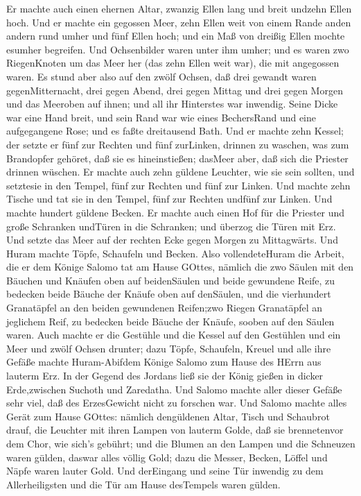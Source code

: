  Er machte auch einen ehernen Altar, zwanzig Ellen lang und
breit undzehn Ellen hoch.  Und er machte ein gegossen Meer,
zehn Ellen weit von einem Rande anden andern rund umher und fünf Ellen
hoch; und ein Maß von dreißig Ellen mochte esumher begreifen.
 Und Ochsenbilder waren unter ihm umher; und es waren zwo
RiegenKnoten um das Meer her (das zehn Ellen weit war), die mit
angegossen waren.  Es stund aber also auf den zwölf Ochsen,
daß drei gewandt waren gegenMitternacht, drei gegen Abend, drei gegen
Mittag und drei gegen Morgen und das Meeroben auf ihnen; und all ihr
Hinterstes war inwendig.  Seine Dicke war eine Hand breit,
und sein Rand war wie eines BechersRand und eine aufgegangene Rose; und
es faßte dreitausend Bath.  Und er machte zehn Kessel; der
setzte er fünf zur Rechten und fünf zurLinken, drinnen zu waschen, was
zum Brandopfer gehöret, daß sie es hineinstießen; dasMeer aber, daß sich
die Priester drinnen wüschen.  Er machte auch zehn güldene
Leuchter, wie sie sein sollten, und setztesie in den Tempel, fünf zur
Rechten und fünf zur Linken.  Und machte zehn Tische und tat
sie in den Tempel, fünf zur Rechten undfünf zur Linken. Und machte
hundert güldene Becken.  Er machte auch einen Hof für die
Priester und große Schranken undTüren in die Schranken; und überzog die
Türen mit Erz.  Und setzte das Meer auf der rechten Ecke
gegen Morgen zu Mittagwärts.  Und Huram machte Töpfe,
Schaufeln und Becken. Also vollendeteHuram die Arbeit, die er dem Könige
Salomo tat am Hause GOttes,  nämlich die zwo Säulen mit den
Bäuchen und Knäufen oben auf beidenSäulen und beide gewundene Reife, zu
bedecken beide Bäuche der Knäufe oben auf denSäulen,  und
die vierhundert Granatäpfel an den beiden gewundenen Reifen;zwo Riegen
Granatäpfel an jeglichem Reif, zu bedecken beide Bäuche der Knäufe,
sooben auf den Säulen waren.  Auch machte er die Gestühle
und die Kessel auf den Gestühlen  und ein Meer und zwölf
Ochsen drunter;  dazu Töpfe, Schaufeln, Kreuel und alle
ihre Gefäße machte Huram-Abifdem Könige Salomo zum Hause des HErrn aus
lauterm Erz.  In der Gegend des Jordans ließ sie der König
gießen in dicker Erde,zwischen Suchoth und Zaredatha.  Und
Salomo machte aller dieser Gefäße sehr viel, daß des ErzesGewicht nicht
zu forschen war.  Und Salomo machte alles Gerät zum Hause
GOttes: nämlich dengüldenen Altar, Tisch und Schaubrot drauf,
 die Leuchter mit ihren Lampen von lauterm Golde, daß sie
brennetenvor dem Chor, wie sich's gebührt;  und die Blumen
an den Lampen und die Schneuzen waren gülden, daswar alles völlig Gold;
 dazu die Messer, Becken, Löffel und Näpfe waren lauter
Gold. Und derEingang und seine Tür inwendig zu dem Allerheiligsten und
die Tür am Hause desTempels waren gülden.

